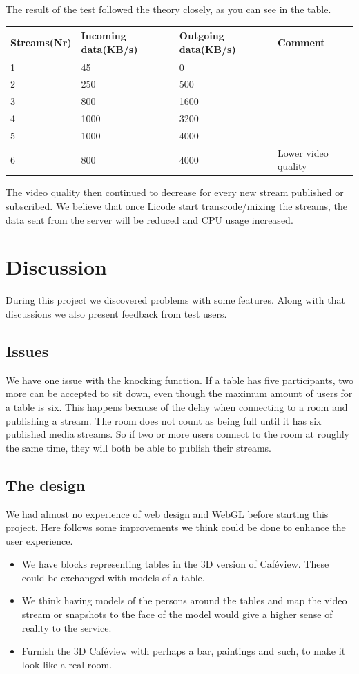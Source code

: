 \documentclass[12pt, titlepage]{article}
\begin{document}
The result of the test followed the theory closely, as you can see in the table.

\begin{center}
    \begin{tabularx}{\textwidth}{|X|X|X|l|}
    \hline
    Streams(Nr) & Incoming data(KB/s) & Outgoing data(KB/s) & Comment \\ \hline
    1 & 45 & 0 & \\ \hline
    2 & 250 & 500 & \\ \hline
    3 & 800 & 1600 & \\ \hline
    4 & 1000 & 3200 &\\ \hline
    5 & 1000 & 4000 &\\ \hline
    6 & 800 & 4000 & Lower video quality\\ \hline
    \end{tabularx}
\end{center}

The video quality then continued to decrease for every new stream published or subscribed. We believe that once Licode start transcode/mixing the streams, the data sent from the server will be reduced and CPU usage increased. 
\section{Discussion}
During this project we discovered problems with some features. Along with that discussions we also present feedback from test users.
\subsection{Issues}
We have one issue with the knocking function. If a table has five participants, two more can be accepted to sit down, even though the maximum amount of users for a table is six. This happens because of the delay when connecting to a room and publishing a stream. The room does not count as being full until it has six published media streams. So if two or more users connect to the room at roughly the same time, they will both be able to publish their streams.
\subsection{The design}
We had almost no experience of web design and WebGL before starting this project. Here follows some improvements we think could be done to enhance the user experience.
\begin{itemize}
\item We have blocks representing tables in the 3D version of Caféview. These could be exchanged with models of a table. 
\item We think having models of the persons around the tables and map the video stream or snapshots to the face of the model would give a higher sense of reality to the service.
\item Furnish the 3D Caféview with perhaps a bar, paintings and such, to make it look like a real room.
\end{itemize}
\end{document}
